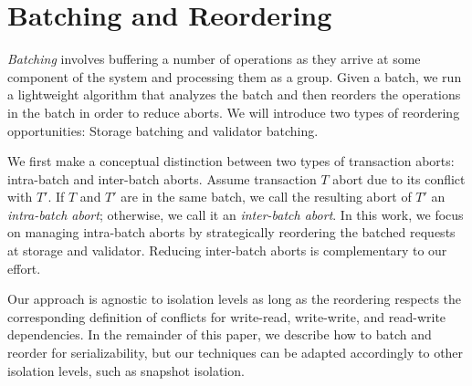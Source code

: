 \section{Batching and Reordering}\label{sec:overview}


\emph{Batching} involves buffering a number of operations as they arrive at some component of the system and processing them as a group. 
Given a batch, we run a lightweight algorithm that analyzes the batch and then reorders the operations in the batch in order to reduce aborts. We will introduce two types of reordering opportunities: Storage batching and validator batching.

We first make a conceptual distinction between two types of transaction aborts: intra-batch and inter-batch aborts. Assume transaction $T$ abort due to its conflict with $T'$. If $T$ and $T'$ are in the same batch, we call the resulting abort of $T'$ an \emph{intra-batch abort}; otherwise, we call it an \emph{inter-batch abort}.
In this work, we focus on managing intra-batch aborts by strategically reordering the batched requests at storage and validator. 
Reducing inter-batch aborts is complementary to our effort. 

Our approach is agnostic to isolation levels as long as the reordering respects the corresponding definition of conflicts for 
write-read, write-write, and read-write dependencies. In the remainder of this paper, we describe 
how to batch and reorder for serializability, but our techniques can be adapted accordingly to other isolation levels, 
such as snapshot isolation.


